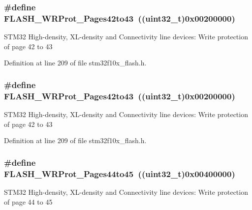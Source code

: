 \subsubsection[{\texorpdfstring{F\+L\+A\+S\+H\+\_\+\+W\+R\+Prot\+\_\+\+Pages42to43}{FLASH_WRProt_Pages42to43}}]{\setlength{\rightskip}{0pt plus 5cm}\#define F\+L\+A\+S\+H\+\_\+\+W\+R\+Prot\+\_\+\+Pages42to43~(({\bf uint32\+\_\+t})0x00200000)}\hypertarget{group___option___bytes___write___protection_gab9583317ad7ec30119cdd97e17e74121}{}\label{group___option___bytes___write___protection_gab9583317ad7ec30119cdd97e17e74121}
S\+T\+M32 High-\/density, X\+L-\/density and Connectivity line devices\+: Write protection of page 42 to 43 

Definition at line 209 of file stm32f10x\+\_\+flash.\+h.

\subsubsection[{\texorpdfstring{F\+L\+A\+S\+H\+\_\+\+W\+R\+Prot\+\_\+\+Pages42to43}{FLASH_WRProt_Pages42to43}}]{\setlength{\rightskip}{0pt plus 5cm}\#define F\+L\+A\+S\+H\+\_\+\+W\+R\+Prot\+\_\+\+Pages42to43~(({\bf uint32\+\_\+t})0x00200000)}\hypertarget{group___option___bytes___write___protection_gab9583317ad7ec30119cdd97e17e74121}{}\label{group___option___bytes___write___protection_gab9583317ad7ec30119cdd97e17e74121}
S\+T\+M32 High-\/density, X\+L-\/density and Connectivity line devices\+: Write protection of page 42 to 43 

Definition at line 209 of file stm32f10x\+\_\+flash.\+h.

\subsubsection[{\texorpdfstring{F\+L\+A\+S\+H\+\_\+\+W\+R\+Prot\+\_\+\+Pages44to45}{FLASH_WRProt_Pages44to45}}]{\setlength{\rightskip}{0pt plus 5cm}\#define F\+L\+A\+S\+H\+\_\+\+W\+R\+Prot\+\_\+\+Pages44to45~(({\bf uint32\+\_\+t})0x00400000)}\hypertarget{group___option___bytes___write___protection_ga934a862a6a5cd350f00f5ded27e4bbd4}{}\label{group___option___bytes___write___protection_ga934a862a6a5cd350f00f5ded27e4bbd4}
S\+T\+M32 High-\/density, X\+L-\/density and Connectivity line devices\+: Write protection of page 44 to 45 

